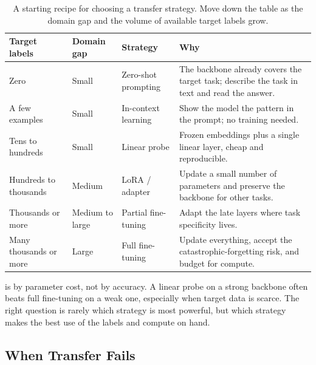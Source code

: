 \begin{table}[ht]
\centering
\begin{tabular}{p{}p{}p{}p{}}
    \toprule
    \textbf{Target labels} & \textbf{Domain gap} & \textbf{Strategy} & \textbf{Why} \\
    \midrule
    Zero & Small & Zero-shot prompting & The backbone already covers the target task; describe the task in text and read the answer. \\
    A few examples & Small & In-context learning & Show the model the pattern in the prompt; no training needed. \\
    Tens to hundreds & Small & Linear probe & Frozen embeddings plus a single linear layer, cheap and reproducible. \\
    Hundreds to thousands & Medium & LoRA / adapter & Update a small number of parameters and preserve the backbone for other tasks. \\
    Thousands or more & Medium to large & Partial fine-tuning & Adapt the late layers where task specificity lives. \\
    Many thousands or more & Large & Full fine-tuning & Update everything, accept the catastrophic-forgetting risk, and budget for compute. \\
    \bottomrule
\end{tabular}
\vspace{2em}
\caption{A starting recipe for choosing a transfer strategy. Move down the table as the domain gap and the volume of available target labels grow.}
\label{tab:transfer_recipe}
\end{table}

 is by parameter cost, not by accuracy. A linear probe on a strong backbone often beats full fine-tuning on a weak one, especially when target data is scarce. The right question is rarely which strategy is most powerful, but which strategy makes the best use of the labels and compute on hand.

\subsection{When Transfer Fails}


